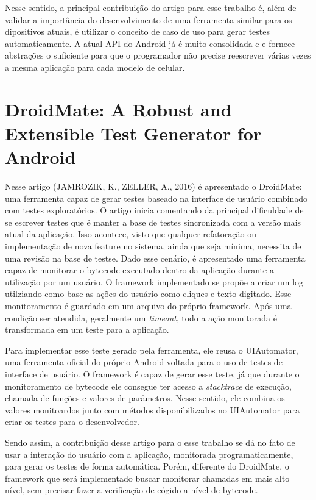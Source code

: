 \documentclass[
    12pt,       %
    openright,      %
    twoside,      %
    a4paper,      %
    english,      %
    french,       %
    spanish,      %
    brazil,       %
    ]{abntex2}
\begin{document}
      Nesse sentido, a principal contribuição do artigo para esse trabalho é, além de validar a importância
      do desenvolvimento de uma ferramenta similar para os dipositivos atuais, é utilizar o conceito de caso
      de uso para gerar testes automaticamente. A atual API do Android já é muito consolidada e e fornece
      abstrações o suficiente para que o programador não precise reescrever várias vezes a mesma aplicação
      para cada modelo de celular.

    \section{DroidMate: A Robust and Extensible Test Generator for Android}
      Nesse artigo (JAMROZIK, K., ZELLER, A., 2016) é apresentado o DroidMate: uma ferramenta
      capaz de gerar testes baseado na interface de usuário combinado com testes
      exploratórios. O artigo inicia comentando da principal dificuldade de se escrever
      testes que é manter a base de testes sincronizada com a versão mais atual da aplicação.
      Isso acontece, visto que qualquer refatoração ou implementação de nova feature no sistema,
      ainda que seja mínima, necessita de uma revisão na base de testse. Dado esse cenário,
      é apresentado uma ferramenta capaz de monitorar o bytecode executado dentro da aplicação
      durante a utilização por um usuário. O framework implementado se propõe a criar
      um log utilziando como base as ações do usuário como cliques e texto
      digitado. Esse monitoramento é guardado em um arquivo do próprio framework. Após
      uma condição ser atendida, geralmente um \textit{timeout}, todo a ação monitorada
      é transformada em um teste para a aplicação.

      Para implementar esse teste gerado pela ferramenta, ele reusa o UIAutomator,
      uma ferramenta oficial do próprio Android voltada para o uso de testes de
      interface de usuário. O framework é capaz de gerar esse teste, já que durante
      o monitoramento de bytecode ele consegue ter acesso a \textit{stacktrace} de
      execução, chamada de funções e valores de parâmetros. Nesse sentido, ele
      combina os valores monitoardos junto com métodos disponibilizados no UIAutomator
      para criar os testes para o desenvolvedor.

      Sendo assim, a contribuição desse artigo para o esse trabalho se dá no fato de usar
      a interação do usuário com a aplicação, monitorada programaticamente, para gerar
      os testes de forma automática. Porém, diferente do DroidMate, o framework que
      será implementado buscar monitorar chamadas em mais alto nível, sem precisar fazer
      a verificação de cógido a nível de bytecode.
\end{document}
